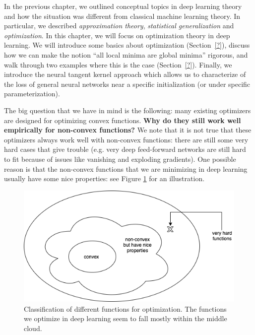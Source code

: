 \setcounter{section}{0}


In the previous chapter, we outlined conceptual topics in deep learning theory and how the situation was different from classical machine learning theory. In particular, we described \textit{approximation theory}, \textit{statistical generalization} and \textit{optimization}. In this chapter, we will focus on optimization theory in deep learning. We will introduce some basics about optimization (Section~\ref{?}), discuss how we can make the notion ``all local minima are global minima'' rigorous, and walk through two examples where this is the case (Section~\ref{?}). Finally, we introduce the neural tangent kernel approach which allows us to characterize of the loss of general neural networks near a specific initialization (or under specific parameterization).


The big question that we have in mind is the following: many existing optimizers are designed for optimizing convex functions. \textbf{Why do they still work well empirically for non-convex functions?} We note that it is not true that these optimizers always work well with non-convex functions: there are still some very hard cases that give trouble (e.g. very deep feed-forward networks are still hard to fit because of issues like vanishing and exploding gradients). One possible reason is that the non-convex functions that we are minimizing in deep learning usually have some nice properties: see Figure \ref{lec10:fig:optimization} for an illustration.

\begin{figure}[ht!]
    \centering
    \includegraphics[scale = 0.5]{figures/landscape.png}
    \caption{Classification of different functions for optimization. The functions we optimize in deep learning seem to fall mostly within the middle cloud.}
    \label{lec10:fig:optimization}
\end{figure}

